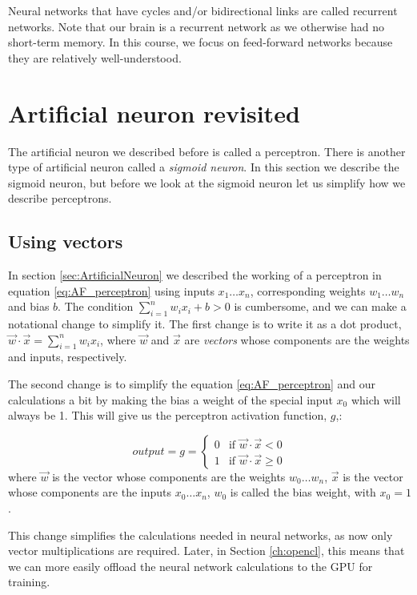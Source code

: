 Neural networks that have cycles and/or bidirectional links are called recurrent networks. Note that our brain is a recurrent network as we otherwise had no short-term memory. In this course, we focus on feed-forward networks because they are relatively well-understood.

\section{Artificial neuron revisited}
\label{sec:neuron_revisted}
The artificial neuron we described before is called a perceptron. There is another type of artificial neuron called a \textit{sigmoid neuron}. In this section we describe the sigmoid neuron, but before we look at the sigmoid neuron let us simplify how we describe perceptrons.

\subsection{Using vectors}%
In section \ref{sec:ArtificialNeuron} we described the working of a perceptron in equation \ref{eq:AF_perceptron} using inputs $x_1 \dots x_n$, corresponding weights $w_1 \dots w_n$ and bias $b$. The condition $\sum_{i=1}^n w_i x_i + b > 0$ is cumbersome, and we can make a notational change to simplify it. The first change is to write it as a dot product, $\vec{w} \cdot \vec{x} = \sum_{i=1}^n w_i x_i$, where $\vec{w}$ and $\vec{x}$ are \textit{vectors} whose components are the weights and inputs, respectively. 

The second change is to simplify the equation \ref{eq:AF_perceptron} and our calculations a bit by making the bias a weight of the special input $x_0$ which will always be 1. This will give us the perceptron activation function, $g$,:

\begin{equation}
\mathit{output} = g = \left\{\begin{matrix}
 0 & \text{if } \vec{w} \cdot \vec{x} < 0\\
 1 & \text{if } \vec{w} \cdot \vec{x} \geq 0
\end{matrix}\right.
\label{eq:AF_perceptron_withbiasasweight}
\end{equation}
where $\vec{w}$ is the vector whose components are the weights $w_0 \dots w_n$, $\vec{x}$ is the vector whose components are the inputs $x_0 \dots x_n$, $w_0$ is called the bias weight, with $x_0 = 1$.

This change simplifies the calculations needed in neural networks, as now only vector multiplications are required. Later, in Section \ref{ch:opencl}, this means that we can more easily offload the neural network calculations to the GPU for training.


